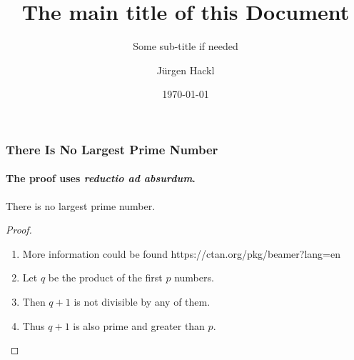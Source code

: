 \documentclass[aspectratio=169
]{beamer}
\author{Jürgen Hackl}
\date{\today}
\title{The main title of this Document}
\subtitle{Some sub-title if needed}
\begin{document}
\begin{frame}
  \frametitle{There Is No Largest Prime Number}
  \framesubtitle{The proof uses \textit{reductio ad absurdum}.}
  \begin{theorem}
    There is no largest prime number.
  \end{theorem}
  \begin{proof}
    \begin{enumerate}
    \item<1-| alert@1> More information could be found https://ctan.org/pkg/beamer?lang=en
    \item<2-> Let $q$ be the product of the first $p$ numbers.
    \item<3-> Then $q+1$ is not divisible by any of them.
    \item<1-> Thus $q+1$ is also prime and greater than $p$.\qedhere
    \end{enumerate}
  \end{proof}
\end{frame}
\end{document}
